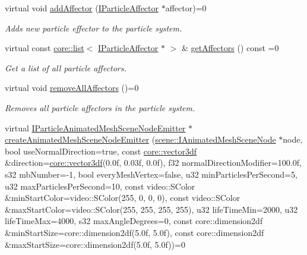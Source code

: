 \begin{DoxyCompactItemize}
virtual void \hyperlink{classirr_1_1scene_1_1IParticleSystemSceneNode_a401f5afbbb748878011c5ceb7d447f8b}{add\+Affector} (\hyperlink{classirr_1_1scene_1_1IParticleAffector}{I\+Particle\+Affector} $\ast$affector)=0
\begin{DoxyCompactList}\small\item\em Adds new particle effector to the particle system. \end{DoxyCompactList}\item 
virtual const \hyperlink{classirr_1_1core_1_1list}{core\+::list}$<$ \hyperlink{classirr_1_1scene_1_1IParticleAffector}{I\+Particle\+Affector} $\ast$ $>$ \& \hyperlink{classirr_1_1scene_1_1IParticleSystemSceneNode_a3a9159e6ec5869814fdf879c5a7c41a3}{get\+Affectors} () const =0
\begin{DoxyCompactList}\small\item\em Get a list of all particle affectors. \end{DoxyCompactList}\item 
\mbox{\label{classirr_1_1scene_1_1IParticleSystemSceneNode_a96df4c07ee0c480cc2e51e157be308c6}} 
virtual void \hyperlink{classirr_1_1scene_1_1IParticleSystemSceneNode_a96df4c07ee0c480cc2e51e157be308c6}{remove\+All\+Affectors} ()=0
\begin{DoxyCompactList}\small\item\em Removes all particle affectors in the particle system. \end{DoxyCompactList}\item 
virtual \hyperlink{classirr_1_1scene_1_1IParticleAnimatedMeshSceneNodeEmitter}{I\+Particle\+Animated\+Mesh\+Scene\+Node\+Emitter} $\ast$ \hyperlink{classirr_1_1scene_1_1IParticleSystemSceneNode_a1459245186d570f81f6c7ff78ddd38db}{create\+Animated\+Mesh\+Scene\+Node\+Emitter} (\hyperlink{classirr_1_1scene_1_1IAnimatedMeshSceneNode}{scene\+::\+I\+Animated\+Mesh\+Scene\+Node} $\ast$node, bool use\+Normal\+Direction=true, const \hyperlink{namespaceirr_1_1core_a06f169d08b5c429f5575acb7edbad811}{core\+::vector3df} \&direction=\hyperlink{namespaceirr_1_1core_a06f169d08b5c429f5575acb7edbad811}{core\+::vector3df}(0.\+0f, 0.\+03f, 0.\+0f), f32 normal\+Direction\+Modifier=100.\+0f, s32 mb\+Number=-\/1, bool every\+Mesh\+Vertex=false, u32 min\+Particles\+Per\+Second=5, u32 max\+Particles\+Per\+Second=10, const video\+::\+S\+Color \&min\+Start\+Color=video\+::\+S\+Color(255, 0, 0, 0), const video\+::\+S\+Color \&max\+Start\+Color=video\+::\+S\+Color(255, 255, 255, 255), u32 life\+Time\+Min=2000, u32 life\+Time\+Max=4000, s32 max\+Angle\+Degrees=0, const core\+::dimension2df \&min\+Start\+Size=core\+::dimension2df(5.\+0f, 5.\+0f), const core\+::dimension2df \&max\+Start\+Size=core\+::dimension2df(5.\+0f, 5.\+0f))=0

\end{DoxyCompactItemize}
